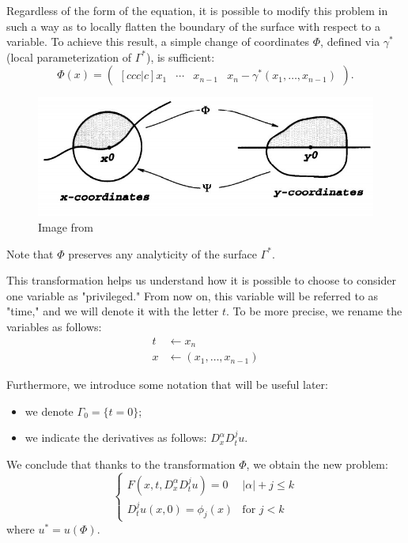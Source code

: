 Regardless of the form of the equation, it is possible to modify this problem in such a way as to locally flatten the boundary of the surface with respect to a variable. To achieve this result, a simple change of coordinates $\Phi$, defined via $\gamma^*$ (local parameterization of $\Gamma^*$), is sufficient:
$$\Phi (x) = 
\left( \begin{matrix}[ccc|c]
x_1 & \cdots & x_{n-1} & x_n-\gamma^* (x_1,\ldots , x_{n-1})
\end{matrix}\right).$$
\begin{figure}[H]
\centering
\includegraphics[scale=.5]{flatb}
\caption{Image from \cite[cap.8]{Evans}}
\end{figure}
\begin{remark}
Note that $\Phi$ preserves any analyticity of the surface $\Gamma^*$.
\end{remark}

This transformation helps us understand how it is possible to choose to consider one variable as "privileged." From now on, this variable will be referred to as "time," and we will denote it with the letter $t$. To be more precise, we rename the variables as follows:
\begin{align*}
t & \leftarrow x_n \\ 
x & \leftarrow (x_1,\ldots , x_{n-1})
\end{align*}

\newpage
Furthermore, we introduce some notation that will be useful later:
\begin{itemize}
\item we denote $\Gamma_0 = \{t=0\}$;
\item we indicate the derivatives as follows: $D^\alpha_x D^j_t u$.
\end{itemize}
We conclude that thanks to the transformation $\Phi$, we obtain the new problem:
\begin{equation}\label{gamma0prob}
\begin{cases}
F(x,t, D^\alpha_x D^j_t u)=0 & |\alpha | +j \leq k\\
D^j_t u (x,0)= \phi_j(x) & \text{for } j<k 
\end{cases}
\end{equation}
where $u^*=u(\Phi)$.

